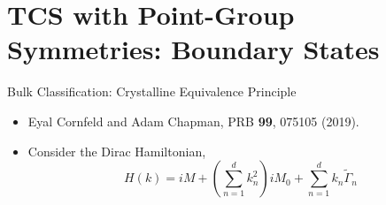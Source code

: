 \documentclass[xcolor=table, 11pt, aspectratio=169]{beamer}
\begin{document}
  \section{TCS with Point-Group Symmetries: Boundary States}

  \begin{frame}{Bulk Classification: Crystalline Equivalence Principle}
    \begin{itemize}
      \item Eyal Cornfeld and Adam Chapman, PRB \textbf{99}, 075105 (2019).
      \item Consider the Dirac Hamiltonian,
      \[H(k)=iM+\left(\sum_{n=1}^d k_n^2\right)iM_0+\sum_{n=1}^d k_n\tilde{\Gamma}_n\]
    \end{itemize}
  \end{frame}
\end{document}
